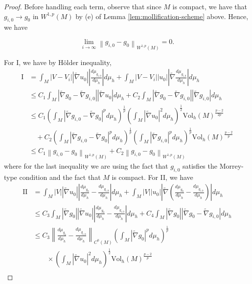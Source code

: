 \documentclass[12pt]{amsart}
\theoremstyle{plain}
\theoremstyle{plain}
\theoremstyle{definition}
\theoremstyle{remark}
\numberwithin{equation}{subsection}
\newcommand{\hdel}{\tilde{\nabla}}
\begin{document}
\begin{proof}
    Before handling each term, observe that since $M$ is compact, we have that $g_{i,0} \to g_0$ in $W^{1,p}(M)$ by (e) of Lemma \ref{lem:mollification-scheme} above. Hence, we have

    \begin{equation*}
        \lim\limits_{i\to\infty}\left\lVert g_{i,0} - g_0\right\rVert_{W^{1,p}(M)} = 0.
    \end{equation*}

    For I, we have by H\"older inequality,
    \begin{align*}
        \text{I} &= \int_M |V - V_i||\hdel u_0|\left|\frac{d\mu_{g_{i,0}}}{d\mu_h}\right|d\mu_h + \int_M |V - V_i||u_0|\left|\hdel\frac{d\mu_{g_{i,0}}}{d\mu_h}\right|d\mu_h \nonumber \\
        &\leq C_1\int_M |\hdel g_0 - \hdel g_{i,0}||\hdel u_0|d\mu_h + C_2\int_M |\hdel g_0 - \hdel g_{i,0}||\hdel g_{i,0}|d\mu_h \nonumber \\
        &\leq C_1\left(\int_M |\hdel g_{i,0} - \hdel g_0|^pd\mu_h\right)^\frac{1}{p}\left(\int_M |\hdel u_0|^2d\mu_h\right)^\frac{1}{2}\text{Vol}_h(M)^\frac{p-2}{2p} \nonumber \\
        &\quad + C_2\left(\int_M |\hdel g_{i,0} - \hdel g_0|^pd\mu_h\right)^\frac{1}{p}\left(\int_M |\hdel g_{i,0}|^pd\mu_h\right)^\frac{1}{p}\text{Vol}_h(M)^\frac{p-2}{p} \nonumber \\
        &\leq C_1\left\lVert g_{i,0} - g_0\right\rVert_{W^{1,p}(M)} + C_2\left\lVert g_{i,0} - g_0\right\rVert_{W^{1,p}(M)}
    \end{align*}
    where for the last inequality we are using the fact that $g_{i,0}$ satisfies the Morrey-type condition and the fact that $M$ is compact. For II, we have
    \begin{align*}
        \text{II} &= \int_M |V||\hdel u_0|\left|\frac{d\mu_{g_0}}{d\mu_h} - \frac{d\mu_{g_{i,0}}}{d\mu_h}\right|d\mu_h + \int_M |V||u_0|\left|\hdel\left(\frac{d\mu_{g_0}}{d\mu_h}-\frac{d\mu_{g_{i,0}}}{d\mu_h}\right)\right|d\mu_h \nonumber \\
        &\leq C_3\int_M |\hdel g_0||\hdel u_0|\left|\frac{d\mu_{g_0}}{d\mu_h} - \frac{d\mu_{g_{i,0}}}{d\mu_h}\right|d\mu_h + C_4\int_M |\hdel g_0||\hdel g_0 - \hdel g_{i,0}|d\mu_h \nonumber \\
        &\leq C_3\left\lVert \frac{d\mu_{g_0}}{d\mu_h} - \frac{d\mu_{g_{i,0}}}{d\mu_h}\right\rVert_{C^0(M)}\left(\int_M |\hdel g_0|^pd\mu_h\right)^\frac{1}{p} \nonumber \\
        &\qquad \times\left(\int_M |\hdel u_0|^2d\mu_h\right)^\frac{1}{2}\text{Vol}_h(M)^\frac{p-2}{p} \nonumber \\

\end{align*}
\end{proof}
\end{document}
